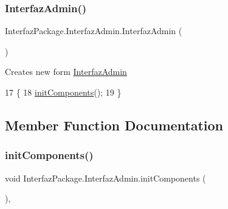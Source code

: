\subsubsection{\texorpdfstring{Interfaz\+Admin()}{InterfazAdmin()}}
{\footnotesize\ttfamily Interfaz\+Package.\+Interfaz\+Admin.\+Interfaz\+Admin (\begin{DoxyParamCaption}{ }\end{DoxyParamCaption})\hspace{0.3cm}{\ttfamily [inline]}}

Creates new form \mbox{\hyperlink{class_interfaz_package_1_1_interfaz_admin}{Interfaz\+Admin}} 
\begin{DoxyCode}
17                            \{
18         \mbox{\hyperlink{class_interfaz_package_1_1_interfaz_admin_a11f45ed6f1f629dd84480a501181f823}{initComponents}}();
19     \}
\end{DoxyCode}


\subsection{Member Function Documentation}
\mbox{\label{class_interfaz_package_1_1_interfaz_admin_a11f45ed6f1f629dd84480a501181f823}} 
\subsubsection{\texorpdfstring{init\+Components()}{initComponents()}}
{\footnotesize\ttfamily void Interfaz\+Package.\+Interfaz\+Admin.\+init\+Components (\begin{DoxyParamCaption}{ }\end{DoxyParamCaption})\hspace{0.3cm}{\ttfamily [inline]}, {\ttfamily [private]}}

